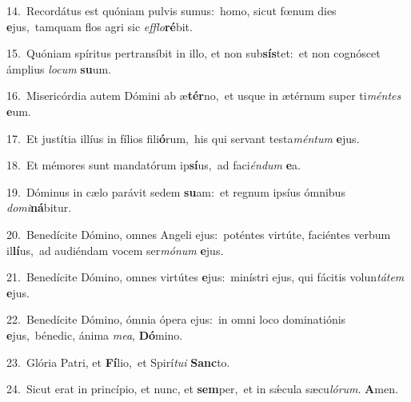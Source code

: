 {\numbfont\textcolor{\numbcolor}{14.}}~Recordátus est quóniam pulvis sumus:~\dagger homo, sicut fœnum dies \textbf{e}\-jus,~\star tamquam flos agri sic \textit{ef}\-\textit{flo}\textbf{ré}bit.\par
{\numbfont\textcolor{\numbcolor}{15.}}~Quóniam spíritus pertransíbit in illo, et non sub\-\textbf{sís}\-tet:~\star et non cognóscet ámplius \textit{lo}\-\textit{cum} \textbf{su}\-um.\par
{\numbfont\textcolor{\numbcolor}{16.}}~Misericórdia autem Dómini ab æ\-\textbf{tér}\-no,~\star et usque in ætérnum super ti\-\textit{mén}\-\textit{tes} \textbf{e}\-um.\par
{\numbfont\textcolor{\numbcolor}{17.}}~Et justítia illíus in fílios fili\-\textbf{ó}\-rum,~\star his qui servant testa\-\textit{mén}\-\textit{tum} \textbf{e}\-jus.\par
{\numbfont\textcolor{\numbcolor}{18.}}~Et mémores sunt mandatórum ip\-\textbf{sí}\-us,~\star ad faci\-\textit{én}\-\textit{dum} \textbf{e}\-a.\par
{\numbfont\textcolor{\numbcolor}{19.}}~Dóminus in cælo parávit sedem \textbf{su}\-am:~\star et regnum ipsíus ómnibus \textit{do}\-\textit{mi}\textbf{ná}bitur.\par
{\numbfont\textcolor{\numbcolor}{20.}}~Benedícite Dómino, omnes Angeli ejus:~\dagger poténtes virtúte, faciéntes verbum il\-\textbf{lí}\-us,~\star ad audiéndam vocem ser\-\textit{mó}\-\textit{num} \textbf{e}\-jus.\par
{\numbfont\textcolor{\numbcolor}{21.}}~Benedícite Dómino, omnes virtútes \textbf{e}\-jus:~\star minístri ejus, qui fácitis volun\-\textit{tá}\-\textit{tem} \textbf{e}\-jus.\par
{\numbfont\textcolor{\numbcolor}{22.}}~Benedícite Dómino, ómnia ópera ejus:~\dagger in omni loco dominatiónis \textbf{e}\-jus,~\star bénedic, ánima \textit{me}\-\textit{a}, \textbf{Dó}\-mino.\par
{\numbfont\textcolor{\numbcolor}{23.}}~Glória Patri, et \textbf{Fí}\-lio,~\star et Spirí\-\textit{tu}\-\textit{i} \textbf{Sanc}\-to.\par
{\numbfont\textcolor{\numbcolor}{24.}}~Sicut erat in princípio, et nunc, et \textbf{sem}\-per,~\star et in sǽcula sæcu\-\textit{ló}\-\textit{rum}. \textbf{A}\-men.\par
